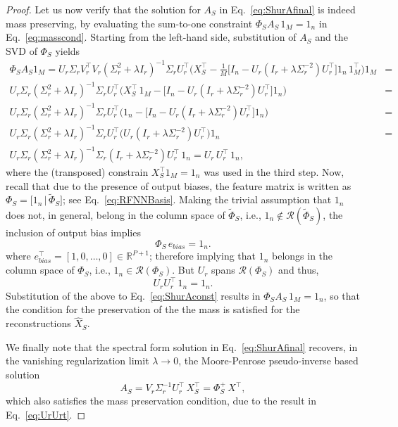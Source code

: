 \documentclass[10pt,a4paper]{amsart}
\begin{document}
\begin{proof}
Let us now verify that the solution for $A_S$ in Eq.~\eqref{eq:ShurAfinal} is indeed mass preserving, by evaluating the sum-to-one constraint $\Phi_S A_S\,1_M=1_n$ in Eq.~\eqref{eq:masscond}. Starting from the left-hand side, substitution of $A_S$ and the SVD of $\Phi_S$ yields
\begin{align}
    \Phi_S A_S1_M = U_r\Sigma_rV_r^{\top }V_r(\Sigma^2_r+\lambda I_r)^{-1}\Sigma_r U^{\top}_r\big(X^{\top}_S-\frac{1}{M}\big[I_n-U_r(I_r + \lambda \Sigma^{-2}_r)U^{\top}_r\big]1_n\,1_M^\top\big)1_M &= \nonumber \\ 
    U_r\Sigma_r(\Sigma^2_r+\lambda I_r)^{-1}\Sigma_r U^{\top}_r\big(X^{\top}_S\, 1_M-\big[I_n-U_r(I_r + \lambda \Sigma^{-2}_r)U^{\top}_r\big]1_n\big) &= \nonumber\\ 
    U_r\Sigma_r(\Sigma^2_r+\lambda I_r)^{-1}\Sigma_r U^{\top}_r\big(1_n-\big[I_n-U_r(I_r + \lambda \Sigma^{-2}_r)U^{\top}_r\big]1_n\big) &= \nonumber \\ 
     U_r\Sigma_r(\Sigma^2_r+\lambda I_r)^{-1}\Sigma_r U^{\top}_r\big(U_r(I_r + \lambda \Sigma^{-2}_r)U^{\top}_r\big)1_n &= \nonumber\\ 
     U_r\Sigma_r(\Sigma^2_r+\lambda I_r)^{-1}\Sigma_r (I_r + \lambda \Sigma^{-2}_r)U^{\top}_r\,1_n=U_r\, U^{\top}_r\,1_n, &
     \label{eq:ShurAconst}
\end{align}
where the (transposed) constrain $X_S^\top 1_M=1_n$ was used in the third step. Now, recall that due to the presence of output biases, the feature matrix is written as $\Phi_S=\big[1_n \, | \, \widetilde{\Phi}_S \big]$; see Eq.~\eqref{eq:RFNNBasis}. Making the trivial assumption that $1_n$ does not, in general, belong in the column space of $\widetilde{\Phi}_S$, i.e., $1_n \notin \mathcal{R}(\widetilde{\Phi}_S)$, the inclusion of output bias implies 
\[\Phi_S \, e_{bias}=1_n.
\] 
where $e_{bias}^\top=[1,0,\ldots,0]\in \mathbb{R}^{P+1}$; therefore implying that $1_n$ belongs in the column space of $\Phi_S$, i.e., $1_n \in \mathcal{R}(\Phi_S)$. But $U_r$ spans $\mathcal{R}(\Phi_S)$ and thus, 
\begin{equation}
U_rU^{\top}_r\,1_n=1_n.
\label{eq:UrUrt}
\end{equation}
Substitution of the above to Eq.~\eqref{eq:ShurAconst} results in $\Phi_S A_S\,1_M=1_n$, so that the condition for the preservation of the the mass is satisfied for the reconstructions $\widehat{X}_S$.

We finally note that the spectral form solution in Eq.~\eqref{eq:ShurAfinal} recovers, in the vanishing regularization limit $\lambda\to0$, the Moore-Penrose pseudo-inverse based solution
\begin{equation}
A_S=V_r\Sigma^{-1}_rU^{\top}_r\,X^{\top}_S=\Phi_S^{+}\, X^{\top},
\end{equation}
which also satisfies the mass preservation condition, due to the result in Eq.~\eqref{eq:UrUrt}.
\end{proof}
\end{document}
